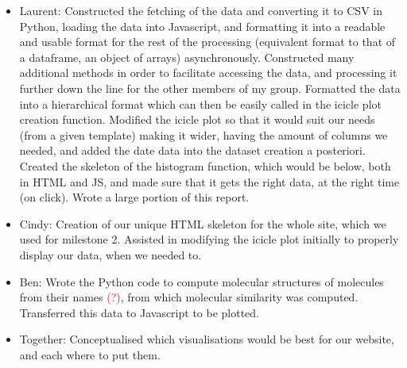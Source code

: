 \documentclass{article}
\begin{document}
\begin{itemize}
    \item Laurent: Constructed the fetching of the data and converting it to CSV in Python, loading the data into Javascript, and formatting it into a readable and usable format for the rest of the processing (equivalent format to that of a dataframe, an object of arrays) asynchronously. Constructed many additional methods in order to facilitate accessing the data, and processing it further down the line for the other members of my group. Formatted the data into a hierarchical format which can then be easily called in the icicle plot creation function. Modified the icicle plot so that it would suit our needs (from a given template) making it wider, having the amount of columns we needed, and added the date data into the dataset creation a posteriori. Created the skeleton of the histogram function, which would be below, both in HTML and JS, and made sure that it gets the right data, at the right time (on click). Wrote a large portion of this report.
    \item Cindy: Creation of our unique HTML skeleton for the whole site, which we used for milestone 2. Assisted in modifying the icicle plot initially to properly display our data, when we needed to.
    \item Ben: Wrote the Python code to compute molecular structures of molecules from their names \textcolor{red}{(?)}, from which molecular similarity was computed. Transferred this data to Javascript to be plotted.
    \item Together: Conceptualised which visualisations would be best for our website, and each where to put them.
\end{itemize}
\end{document}

